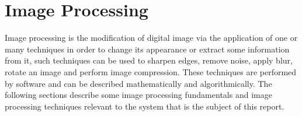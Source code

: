 \section{Image Processing}

Image processing is the modification of digital image via the application of one or many techniques in order to change its appearance or extract some information from it, such techniques can be used to sharpen edges, remove noise, apply blur, rotate an image and perform image compression. These techniques are performed by software and can be described mathematically and algorithmically. The following sections describe some image processing fundamentals and image processing techniques relevant to the system that is the subject of this report.



